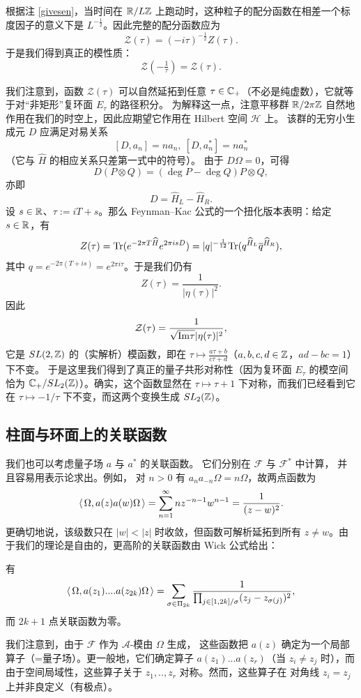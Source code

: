 根据注 \ref{givesen}，当时间在 $\Bbb R/L\Bbb Z$ 上跑动时，这种粒子的配分函数在相差一个标度因子的意义下是 $L^{-\frac{1}{2}}$。因此完整的配分函数应为
$$
\mathcal Z(\tau)=(-i\tau)^{-\frac{1}{2}}Z(\tau). 
$$
于是我们得到真正的模性质：
$$
\mathcal Z(-\tfrac{1}{\tau})=\mathcal Z(\tau).
$$

我们注意到，函数 $\mathcal Z(\tau)$ 可以自然延拓到任意 $\tau\in \Bbb C_+$（不必是纯虚数），它就等于对“非矩形”复环面 $E_\tau$ 的路径积分。
为解释这一点，注意平移群 $\Bbb R/2\pi \Bbb Z$ 自然地作用在我们的时空上，因此应期望它作用在 Hilbert 空间 $\mathcal H$ 上。
该群的无穷小生成元 $D$ 应满足对易关系
$$
[D,a_n]=na_n,\ [D,a_n^*]=na_n^*
$$ 
（它与 $\widehat H$ 的相应关系只差第一式中的符号）。
由于 $D\Omega=0$，可得
$$
D(P\otimes Q)=(\deg P-\deg Q)P\otimes Q,
$$
亦即
$$
D=\widehat H_L-\widehat H_R.
$$ 
设 $s\in \Bbb R$、$\tau:=iT+s$。那么 Feynman--Kac 公式的一个扭化版本表明：给定 $s\in \Bbb R$，有
$$
Z(\tau)={\rm Tr}(e^{-2\pi T\widehat H}e^{2\pi isD})=|q|^{-\frac{1}{12}}{\rm Tr}(q^{\widehat H_L} \overline q^{\widehat H_R}),
$$
其中 $q=e^{-2\pi(T+is)}=e^{2\pi i\tau}$。于是我们仍有
$$
Z(\tau)=\frac{1}{|\eta(\tau)|^{2}}.
$$
因此
$$
\mathcal Z(\tau)=\frac{1}{\sqrt{{\rm Im}\tau} |\eta(\tau)|^2},
$$
它是 $SL(2,\Bbb Z)$ 的（实解析）模函数，即在
$\tau\mapsto \frac{a\tau+b}{c\tau+d}$（$a,b,c,d\in \Bbb Z$，$ad-bc=1$）下不变。
于是这里我们得到了真正的量子共形对称性（因为复环面 $E_\tau$ 的模空间恰为 $\Bbb C_+/SL_2(\Bbb Z)$）。确实，这个函数显然在 $\tau\mapsto \tau+1$ 下对称，而我们已经看到它在 $\tau\mapsto -1/\tau$ 下不变，而这两个变换生成 $SL_2(\Bbb Z)$。

\subsection{柱面与环面上的关联函数} 
我们也可以考虑量子场 $a$ 与 $a^*$ 的关联函数。
它们分别在 $\mathcal F$ 与 $\mathcal F^*$ 中计算，
并且容易用表示论求出。例如，
对 $n>0$ 有 $a_{n}a_{-n}\Omega=n\Omega$，故两点函数为
$$
\la \Omega, a(z)a(w)\Omega\ra=\sum_{n=1}^\infty nz^{-n-1}w^{n-1}=\frac{1}{(z-w)^2}.
$$
更确切地说，该级数只在 $|w|<|z|$ 时收敛，但函数可解析延拓到所有 $z\ne w$。由于我们的理论是自由的，更高阶的关联函数由 Wick 公式给出：

\begin{proposition}\label{corfu} 有
$$
\la \Omega,a(z_1)....a(z_{2k})\Omega\ra=\sum_{\sigma\in \Pi_{2k}}\frac{1}{\prod_{j\in [1,2k]/\sigma}(z_j-z_{\sigma(j)})^2},
$$
而 $2k+1$ 点关联函数为零。
\end{proposition} 

我们注意到，由于 $\mathcal F$ 作为 $\mathcal A$-模由 $\Omega$ 生成，
这些函数把 $a(z)$ 确定为一个局部算子（=量子场）。更一般地，它们确定算子
$a(z_1)...a(z_r)$（当 $z_i\ne z_j$ 时），而由于空间局域性，这些算子关于 $z_1,..,z_r$ 对称。然而，这些算子在
对角线 $z_i=z_j$ 上并非良定义（有极点）。
 
